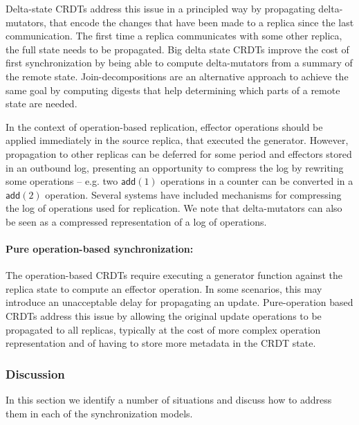 \documentclass[11pt,a4paper]{article}
\begin{document}
Delta-state CRDTs \cite{DBLP:conf/netys/AlmeidaSB15,DBLP:journals/jpdc/AlmeidaSB18} address this issue 
in a principled way by propagating delta-mutators, that encode the changes that have been made
to a replica since the last communication.
The first time a replica communicates with some other replica, the full state
needs to be propagated.
Big delta state CRDTs \cite{vanderLinde06bigdelta} improve the cost of 
first synchronization by being able to compute delta-mutators from a summary
of the remote state. 
Join-decompositions \cite{Enes2017} are an alternative approach to achieve the same goal 
by computing digests that help determining which parts of a remote state are needed.

In the context of operation-based replication, effector operations should be applied 
immediately in the source replica, that executed the generator. 
However, propagation to other replicas can be deferred for some period and 
effectors stored in an outbound log, presenting an opportunity to 
compress the log by rewriting some operations -- e.g. two $\mathsf{add}(1)$ operations
in a counter can be converted in a $\mathsf{add}(2)$ operation. 
Several systems \cite{rover,Kistler92Disconnected,Preguica00Data,Cabrita17Non} have included
mechanisms for compressing the log of operations used for replication.
We note that delta-mutators can also be seen as a compressed representation
of a log of operations.

\paragraph{Pure operation-based synchronization:}
The operation-based CRDTs require executing a generator function against
the replica state to compute an effector operation.
In some scenarios, this may introduce an unacceptable delay for propagating
an update. 
Pure-operation based CRDTs \cite{Baquero14Making} address this issue by 
allowing the original update operations to be propagated to all replicas,
typically at the cost of more complex operation representation and 
of having to store more metadata in the CRDT state.

\subsubsection{Discussion}

In this section we identify a number of situations and discuss how to address
them in each of the synchronization models.
\end{document}
